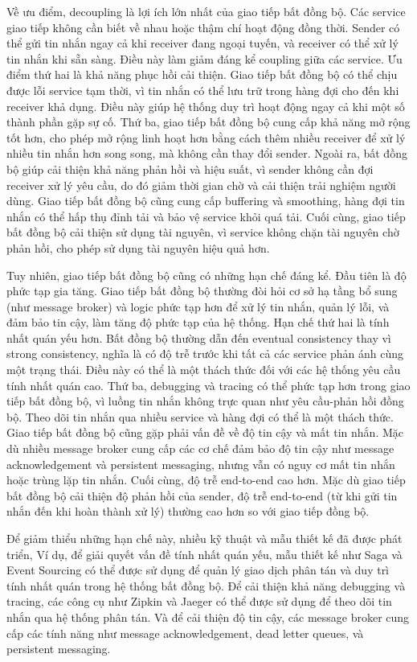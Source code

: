 Về ưu điểm, decoupling là lợi ích lớn nhất của giao tiếp bất đồng bộ. Các service giao tiếp không cần biết về nhau hoặc thậm chí hoạt động đồng thời. Sender có thể gửi tin nhắn ngay cả khi receiver đang ngoại tuyến, và receiver có thể xử lý tin nhắn khi sẵn sàng. Điều này làm giảm đáng kể coupling giữa các service. Ưu điểm thứ hai là khả năng phục hồi cải thiện. Giao tiếp bất đồng bộ có thể chịu được lỗi service tạm thời, vì tin nhắn có thể lưu trữ trong hàng đợi cho đến khi receiver khả dụng. Điều này giúp hệ thống duy trì hoạt động ngay cả khi một số thành phần gặp sự cố. Thứ ba, giao tiếp bất đồng bộ cung cấp khả năng mở rộng tốt hơn, cho phép mở rộng linh hoạt hơn bằng cách thêm nhiều receiver để xử lý nhiều tin nhắn hơn song song, mà không cần thay đổi sender. Ngoài ra, bất đồng bộ giúp cải thiện khả năng phản hồi và hiệu suất, vì sender không cần đợi receiver xử lý yêu cầu, do đó giảm thời gian chờ và cải thiện trải nghiệm người dùng. Giao tiếp bất đồng bộ cũng cung cấp buffering và smoothing, hàng đợi tin nhắn có thể hấp thụ đỉnh tải và bảo vệ service khỏi quá tải. Cuối cùng, giao tiếp bất đồng bộ cải thiện sử dụng tài nguyên, vì service không chặn tài nguyên chờ phản hồi, cho phép sử dụng tài nguyên hiệu quả hơn.

Tuy nhiên, giao tiếp bất đồng bộ cũng có những hạn chế đáng kể. Đầu tiên là độ phức tạp gia tăng. Giao tiếp bất đồng bộ thường đòi hỏi cơ sở hạ tầng bổ sung (như message broker) và logic phức tạp hơn để xử lý tin nhắn, quản lý lỗi, và đảm bảo tin cậy, làm tăng độ phức tạp của hệ thống. Hạn chế thứ hai là tính nhất quán yếu hơn. Bất đồng bộ thường dẫn đến eventual consistency thay vì strong consistency, nghĩa là có độ trễ trước khi tất cả các service phản ánh cùng một trạng thái. Điều này có thể là một thách thức đối với các hệ thống yêu cầu tính nhất quán cao. Thứ ba, debugging và tracing có thể phức tạp hơn trong giao tiếp bất đồng bộ, vì luồng tin nhắn không trực quan như yêu cầu-phản hồi đồng bộ. Theo dõi tin nhắn qua nhiều service và hàng đợi có thể là một thách thức. Giao tiếp bất đồng bộ cũng gặp phải vấn đề về độ tin cậy và mất tin nhắn. Mặc dù nhiều message broker cung cấp các cơ chế đảm bảo độ tin cậy như message acknowledgement và persistent messaging, nhưng vẫn có nguy cơ mất tin nhắn hoặc trùng lặp tin nhắn. Cuối cùng, độ trễ end-to-end cao hơn. Mặc dù giao tiếp bất đồng bộ cải thiện độ phản hồi của sender, độ trễ end-to-end (từ khi gửi tin nhắn đến khi hoàn thành xử lý) thường cao hơn so với giao tiếp đồng bộ.

Để giảm thiểu những hạn chế này, nhiều kỹ thuật và mẫu thiết kế đã được phát triển, Ví dụ, để giải quyết vấn đề tính nhất quán yếu, mẫu thiết kế như Saga và Event Sourcing có thể được sử dụng để quản lý giao dịch phân tán và duy trì tính nhất quán trong hệ thống bất đồng bộ. Để cải thiện khả năng debugging và tracing, các công cụ như Zipkin và Jaeger có thể được sử dụng để theo dõi tin nhắn qua hệ thống phân tán. Và để cải thiện độ tin cậy, các message broker cung cấp các tính năng như message acknowledgement, dead letter queues, và persistent messaging.

